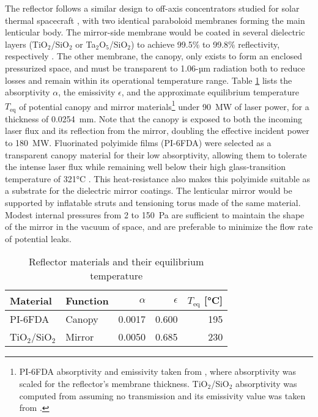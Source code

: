 \documentclass[final,3p,times,twocolumn,sort&compress, lefttitle]{elsarticle}
\begin{document}
            The reflector follows a similar design to off-axis concentrators studied for solar thermal spacecraft \cite{grossman_inflatable_1990, grossman_analysis_1991}, with two identical paraboloid membranes forming the main lenticular body. The mirror-side membrane would be coated in several dielectric layers (TiO$_2$/SiO$_2$ or Ta$_2$O$_5$/SiO$_2$) to achieve 99.5\% to 99.8\% reflectivity, respectively \cite{watkins_optical_1993}. The other membrane, the canopy, only exists to form an enclosed pressurized space, and must be transparent to 1.06-µm radiation both to reduce losses and remain within its operational temperature range. Table \ref{tab:reflectorTemp} lists the absorptivity $\alpha$, the emissivity $\epsilon$, and the approximate equilibrium temperature $T_\text{eq}$ of potential canopy and mirror materials\footnote{PI-6FDA absorptivity and emissivity taken from \cite{xiao_high_2017}, where absorptivity was scaled for the reflector's membrane thickness. TiO$_2$/SiO$_2$ absorptivity was computed from \cite{watkins_optical_1993} assuming no transmission and its emissivity value was taken from \cite{yang_preparation_2011}.} under 90~MW of laser power, for a thickness of 0.0254~mm. Note that the canopy is exposed to both the incoming laser flux and its reflection from the mirror, doubling the effective incident power to 180~MW. Fluorinated polyimide films (PI-6FDA) were selected as a transparent canopy material for their low absorptivity, allowing them to tolerate the intense laser flux while remaining well below their high glass-transition temperature of 321°C \cite{xiao_high_2017}. This heat-resistance also makes this polyimide suitable as a substrate for the dielectric mirror coatings. The lenticular mirror would be supported by inflatable struts and tensioning torus made of the same material. Modest internal pressures from 2 to 150~Pa are sufficient to maintain the shape of the mirror in the vacuum of space, and are preferable to minimize the flow rate of potential leaks.
        
            \begin{table}[t]
                \centering
                \caption{Reflector materials and their equilibrium temperature}
                \label{tab:reflectorTemp}
                \begin{tabular}{@{}llrrr@{}}
                    \toprule
                    Material        & Function & $\alpha$ & $\epsilon$ & $T_\text{eq}$ {[}°C{]} \\ \midrule
                    PI-6FDA & Canopy   & 0.0017   & 0.600      & 195                    \\
                    TiO$_2$/SiO$_2$ & Mirror   & 0.0050   & 0.685      & 230                    \\ \bottomrule
                \end{tabular}
            \end{table}
            
\end{document}
